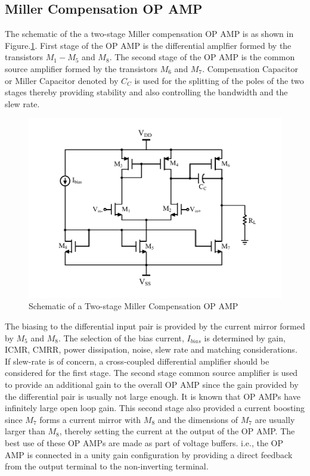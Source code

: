 \subsection{Miller Compensation OP AMP}
The schematic of the a two-stage Miller compensation OP AMP is as shown in Figure.\ref{fig:OPAMP_Schematic_Ibias}. First stage of the OP AMP is the differential amplfier formed by the transistors $M_1-M_5$ and $M_8$. The second stage of the OP AMP is the common source amplifier formed by the transistors $M_6$ and $M_7$. Compensation Capacitor or Miller Capacitor denoted by $C_C$ is used for the splitting of the poles of the two stages thereby providing stability and also controlling the bandwidth and the slew rate. 
\begin{figure} [H]
\centering
\includegraphics[scale=1]{Figures/Schematics/OPAMP_Ibias.pdf}
\caption{Schematic of a Two-stage Miller Compensation OP AMP}
\label{fig:OPAMP_Schematic_Ibias}
\end{figure}
The biasing to the differential input pair is provided by the current mirror formed by $M_5$ and $M_8$. The selection of the bias current, $I_{bias}$ is determined by gain, ICMR, CMRR, power dissipation, noise, slew rate and matching considerations. If slew-rate is of concern, a cross-coupled differential amplifier should be considered for the first stage. The second stage common source amplifier is used to provide an additional gain to the overall OP AMP since the gain provided by the differential pair is usually not large enough. It is known that OP AMPs have infinitely large open loop gain. This second stage also provided a current boosting since $M_7$ forms a current mirror with $M_8$ and the dimensions of $M_7$ are usually larger than $M_8$, thereby setting the current at the output of the OP AMP. The best use of these OP AMPs are made as part of voltage buffers. i.e., the OP AMP is connected in a unity gain configuration by providing a direct feedback from the output terminal to the non-inverting terminal.
\vfill
\clearpage
